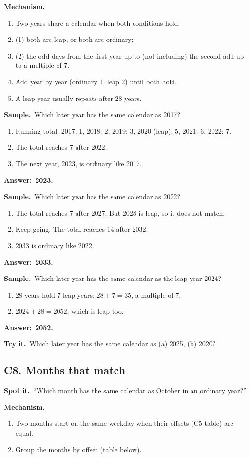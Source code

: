 \documentclass[11pt,a4paper]{article}
\let\oldsubsection\subsection
\renewcommand{\subsection}{\needspace{9\baselineskip}\oldsubsection}
\newcommand{\spot}{\textbf{\color{ember}Spot it.}\ }
\newcommand{\mech}{\textbf{\color{ember}Mechanism.}\ }
\newif\ifkeepsamp
\newcommand{\ans}[1]{\par\nopagebreak\noindent\textbf{\color{ember}Answer:}\ \textbf{#1}\par}
\newcommand{\samp}{\ifkeepsamp\needspace{4\baselineskip}\fi\textbf{\color{ember}Sample.}\ }
\newcommand{\tryit}[1]{\textbf{\color{ember}Try it.}\ #1}
\begin{document}
\mech
\begin{enumerate}
\item Two years share a calendar when both conditions hold:
\item (1) both are leap, or both are ordinary;
\item (2) the odd days from the first year up to (not including) the second add up to a multiple of 7.
\item Add year by year (ordinary 1, leap 2) until both hold.
\item A leap year usually repeats after 28 years.
\end{enumerate}

\samp Which later year has the same calendar as 2017?
\begin{enumerate}
\item Running total: 2017: 1, 2018: 2, 2019: 3, 2020 (leap): 5, 2021: 6, 2022: 7.
\item The total reaches 7 after 2022.
\item The next year, 2023, is ordinary like 2017.
\end{enumerate}
\ans{2023.}

\samp Which later year has the same calendar as 2022?
\begin{enumerate}
\item The total reaches 7 after 2027. But 2028 is leap, so it does not match.
\item Keep going. The total reaches 14 after 2032.
\item 2033 is ordinary like 2022.
\end{enumerate}
\ans{2033.}

\samp Which later year has the same calendar as the leap year 2024?
\begin{enumerate}
\item 28 years hold 7 leap years: $28 + 7 = 35$, a multiple of 7.
\item $2024 + 28 = 2052$, which is leap too.
\end{enumerate}
\ans{2052.}

\tryit Which later year has the same calendar as (a) 2025, (b) 2020?

\subsection{C8. Months that match}
\spot ``Which month has the same calendar as October in an ordinary year?''

\mech
\begin{enumerate}
\item Two months start on the same weekday when their offsets (C5 table) are equal.
\item Group the months by offset (table below).
\end{enumerate}
\end{document}
